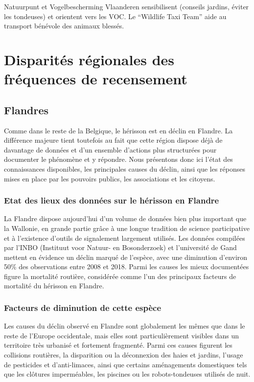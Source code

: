 \documentclass[a4paper,11pt]{article}
\begin{document}
Natuurpunt et Vogelbescherming Vlaanderen sensibilisent (conseils jardins, éviter les tondeuses) et orientent vers les VOC. Le \enquote{Wildlife Taxi Team} aide au transport bénévole des animaux blessés.

\section{Disparités régionales des fréquences de recensement}

\subsection{Flandres}

Comme dans le reste de la Belgique, le hérisson est en déclin en Flandre. La différence majeure tient toutefois au fait que cette région dispose déjà de davantage de données et d’un ensemble d’actions plus structurées pour documenter le phénomène et y répondre. Nous présentons donc ici l’état des connaissances disponibles, les principales causes du déclin, ainsi que les réponses mises en place par les pouvoirs publics, les associations et les citoyens.

\subsubsection{Etat des lieux des données sur le hérisson en Flandre}

La Flandre dispose aujourd’hui d’un volume de données bien plus important que la Wallonie, en grande partie grâce à une longue tradition de science participative et à l’existence d’outils de signalement largement utilisés. Les données compilées par l’INBO (Instituut voor Natuur- en Bosonderzoek) et l’université de Gand mettent en évidence un déclin marqué de l’espèce, avec une diminution d’environ 50\% des observations entre 2008 et 2018. Parmi les causes les mieux documentées figure la mortalité routière, considérée comme l’un des principaux facteurs de mortalité du hérisson en Flandre.

\subsubsection{Facteurs de diminution de cette espèce}

Les causes du déclin observé en Flandre sont globalement les mêmes que dans le reste de l’Europe occidentale, mais elles sont particulièrement visibles dans un territoire très urbanisé et fortement fragmenté. Parmi ces causes figurent les collisions routières, la disparition ou la déconnexion des haies et jardins, l’usage de pesticides et d’anti-limaces, ainsi que certains aménagements domestiques tels que les clôtures imperméables, les piscines ou les robots-tondeuses utilisés de nuit.
\end{document}
